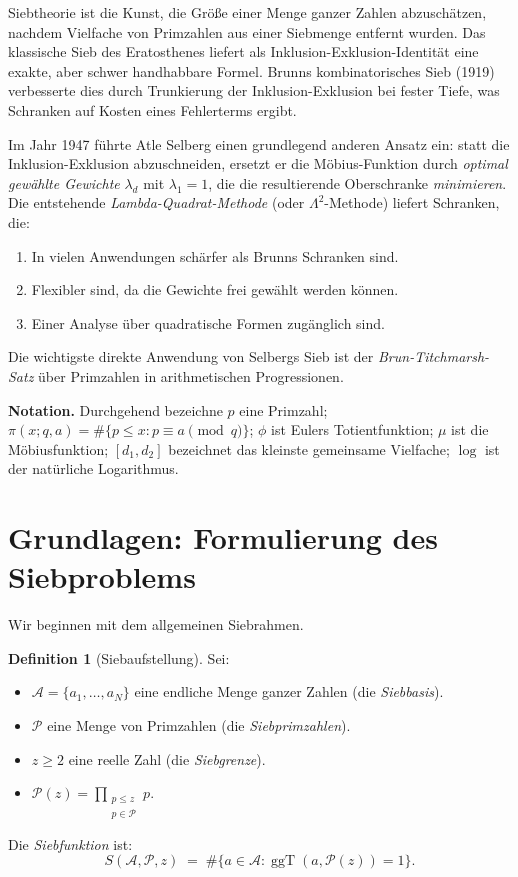 \documentclass[12pt,a4paper]{amsart}
\theoremstyle{definition}
\newtheorem{definition}[theorem]{Definition}
\DeclareMathOperator{\ggT}{ggT}
\begin{document}
Siebtheorie ist die Kunst, die Größe einer Menge ganzer Zahlen abzuschätzen,
nachdem Vielfache von Primzahlen aus einer Siebmenge entfernt wurden.  Das
klassische Sieb des Eratosthenes liefert als Inklusion-Exklusion-Identität
eine exakte, aber schwer handhabbare Formel.  Brunns kombinatorisches Sieb
(1919) verbesserte dies durch Trunkierung der Inklusion-Exklusion bei fester
Tiefe, was Schranken auf Kosten eines Fehlerterms ergibt.

Im Jahr 1947 führte Atle Selberg einen grundlegend anderen Ansatz ein: statt
die Inklusion-Exklusion abzuschneiden, ersetzt er die Möbius-Funktion durch
\emph{optimal gewählte Gewichte} $\lambda_d$ mit $\lambda_1 = 1$, die die
resultierende Oberschranke \emph{minimieren}.  Die entstehende
\emph{Lambda-Quadrat-Methode} (oder $\Lambda^2$-Methode) liefert Schranken,
die:
\begin{enumerate}
  \item In vielen Anwendungen schärfer als Brunns Schranken sind.
  \item Flexibler sind, da die Gewichte frei gewählt werden können.
  \item Einer Analyse über quadratische Formen zugänglich sind.
\end{enumerate}

Die wichtigste direkte Anwendung von Selbergs Sieb ist der
\emph{Brun-Titchmarsh-Satz} über Primzahlen in arithmetischen Progressionen.

\textbf{Notation.}
Durchgehend bezeichne $p$ eine Primzahl; $\pi(x; q, a) = \#\{p \leq x : p \equiv a \pmod q\}$;
$\phi$ ist Eulers Totientfunktion; $\mu$ ist die Möbiusfunktion; $[d_1, d_2]$
bezeichnet das kleinste gemeinsame Vielfache; $\log$ ist der natürliche Logarithmus.

\section{Grundlagen: Formulierung des Siebproblems}
\label{sec:grundlagen}

Wir beginnen mit dem allgemeinen Siebrahmen.

\begin{definition}[Siebaufstellung]\label{def:sieb}
  Sei:
  \begin{itemize}
    \item $\mathcal{A} = \{a_1, \ldots, a_N\}$ eine endliche Menge ganzer Zahlen
      (die \emph{Siebbasis}).
    \item $\mathcal{P}$ eine Menge von Primzahlen (die \emph{Siebprimzahlen}).
    \item $z \geq 2$ eine reelle Zahl (die \emph{Siebgrenze}).
    \item $\mathcal{P}(z) = \prod_{\substack{p \leq z \\ p \in \mathcal{P}}} p$.
  \end{itemize}
  Die \emph{Siebfunktion} ist:
  \[
    S(\mathcal{A}, \mathcal{P}, z)
    \;=\; \#\{a \in \mathcal{A} : \ggT(a, \mathcal{P}(z)) = 1\}.
  \]
\end{definition}
\end{document}
